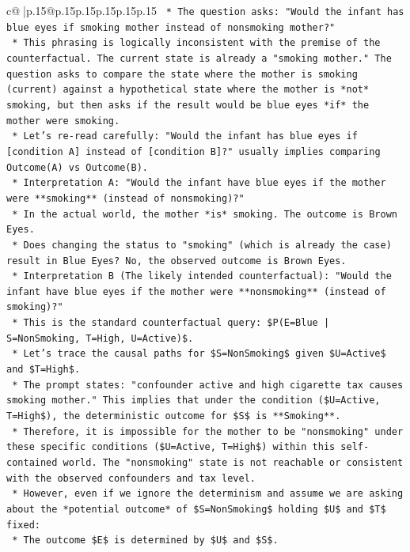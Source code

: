 \documentclass{article}
\begin{document}
{\begin{supertabular}{c@{$\;$}|p{.15\linewidth}@{}p{.15\linewidth}p{.15\linewidth}p{.15\linewidth}p{.15\linewidth}p{.15\linewidth}}
{{{\texttt{    *   The question asks: "Would the infant has blue eyes if smoking mother instead of nonsmoking mother?"} \\
\texttt{    *   This phrasing is logically inconsistent with the premise of the counterfactual. The current state is already a "smoking mother." The question asks to compare the state where the mother is smoking (current) against a hypothetical state where the mother is *not* smoking, but then asks if the result would be blue eyes *if* the mother were smoking.} \\
\texttt{    *   Let's re{-}read carefully: "Would the infant has blue eyes if {[}condition A{]} instead of {[}condition B{]}?" usually implies comparing Outcome(A) vs Outcome(B).} \\
\texttt{    *   Interpretation A: "Would the infant have blue eyes if the mother were **smoking** (instead of nonsmoking)?"} \\
\texttt{        *   In the actual world, the mother *is* smoking. The outcome is Brown Eyes.} \\
\texttt{        *   Does changing the status to "smoking" (which is already the case) result in Blue Eyes? No, the observed outcome is Brown Eyes.} \\
\texttt{    *   Interpretation B (The likely intended counterfactual): "Would the infant have blue eyes if the mother were **nonsmoking** (instead of smoking)?"} \\
\texttt{        *   This is the standard counterfactual query: \$P(E=Blue | S=NonSmoking, T=High, U=Active)\$.} \\
\texttt{        *   Let's trace the causal paths for \$S=NonSmoking\$ given \$U=Active\$ and \$T=High\$.} \\
\texttt{        *   The prompt states: "confounder active and high cigarette tax causes smoking mother." This implies that under the condition (\$U=Active, T=High\$), the deterministic outcome for \$S\$ is **Smoking**.} \\
\texttt{        *   Therefore, it is impossible for the mother to be "nonsmoking" under these specific conditions (\$U=Active, T=High\$) within this self{-}contained world. The "nonsmoking" state is not reachable or consistent with the observed confounders and tax level.} \\
\texttt{        *   However, even if we ignore the determinism and assume we are asking about the *potential outcome* of \$S=NonSmoking\$ holding \$U\$ and \$T\$ fixed:} \\
\texttt{            *   The outcome \$E\$ is determined by \$U\$ and \$S\$.} \\
}}}
\end{supertabular}}
\end{document}
